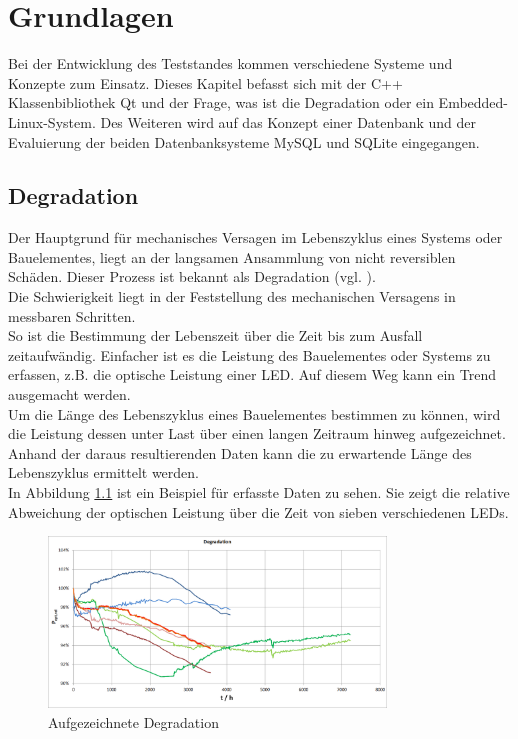 \chapter{Grundlagen}
\label{chapter_Grundlagen}

Bei der Entwicklung des Teststandes kommen verschiedene Systeme und Konzepte zum Einsatz. Dieses Kapitel befasst sich mit der C++ Klassenbibliothek Qt und der Frage, was ist die Degradation oder ein Embedded-Linux-System. Des Weiteren wird auf das Konzept einer Datenbank und der Evaluierung der beiden Datenbanksysteme MySQL und SQLite eingegangen.

\section{Degradation}
\label{section_Degradation}
Der Hauptgrund für mechanisches Versagen im Lebenszyklus eines Systems oder Bauelementes, liegt an der langsamen Ansammlung von nicht reversiblen Schäden. Dieser Prozess ist bekannt als Degradation (vgl. \cite{zhou2011}).\\
Die Schwierigkeit liegt in der Feststellung des mechanischen Versagens in messbaren Schritten.\\
So ist die Bestimmung der Lebenszeit über die Zeit bis zum Ausfall zeitaufwändig. Einfacher ist es die Leistung des Bauelementes oder Systems zu erfassen, z.B. die optische Leistung einer \ac{LED}. Auf diesem Weg kann ein Trend ausgemacht werden.\\
Um die Länge des Lebenszyklus eines Bauelementes bestimmen zu können, wird die Leistung dessen unter Last über einen langen Zeitraum hinweg aufgezeichnet. Anhand der daraus resultierenden Daten kann die zu erwartende Länge des Lebenszyklus ermittelt werden.\\
In Abbildung \ref{figure_Degradation} ist ein Beispiel für erfasste Daten zu sehen. Sie zeigt die relative Abweichung der optischen Leistung über die Zeit von sieben verschiedenen \acp{LED}. 

 
\begin{figure}[H]
\begin{center}
\includegraphics[width=0.8\textwidth]{img/general/Degradation.png}
\caption{Aufgezeichnete Degradation}
\label{figure_Degradation}
\end{center}
\end{figure}



